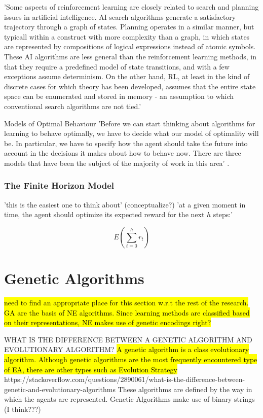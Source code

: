 'Some aspects of reinforcement learning are closely related to search and planning issues in artificial intelligence. AI search algorithms generate a satisfactory trajectory through a graph of states. Planning operates in a similar manner, but typicall within a construct with more complexity than a graph, in which states are represented by compositions of logical expressions instead of atomic symbols. These AI algorithms are less general than the reinforcement learning methods, in that they require a predefined model of state transitions, and with a few exceptions assume determinism. On the other hand, RL, at least in the kind of discrete cases for which theory has been developed, assumes that the entire state space can be enumerated and stored in memory - an assumption to which conventional search algorithms are not tied.' \cite{KaelblingLittmanMoore1996}

Models of Optimal Behaviour
'Before we can start thinking about algorithms for learning to behave optimally, we have to decide what our model of optimality will be. In particular, we have to specify how the agent should take the future into account in the decisions it makes about how to behave now. There are three models that have been the subject of the majority of work in this area' \cite{KaelblingLittmanMoore1996}.

\subsubsection{The Finite Horizon Model} \cite{KaelblingLittmanMoore1996}
'this is the easiest one to think about' (conceptualize?)
'at a given moment in time, the agent should optimize its expected reward for the next $h$ steps:'

\begin{equation}
E(\sum_{t=0}^{h} r_t)
\end{equation}



\section{Genetic Algorithms}

\hl{need to find an appropriate place for this section w.r.t the rest of the research. GA are the basis of NE algorithms. Since learning methods are classified based on their representations, NE makes use of genetic encodings right?}

WHAT IS THE DIFFERENCE BETWEEN A GENETIC ALGORITHM AND EVOLUTIONARY ALGORITHM?
\hl{A genetic algorithm is a class evolutionary algorithm. Although genetic algorithms are the most frequently encountered type of EA, there are other types such as Evolution Strategy}
https://stackoverflow.com/questions/2890061/what-is-the-difference-between-genetic-and-evolutionary-algorithms
These algorithms are defined by the way in which the agents are represented. Genetic Algorithms make use of binary strings (I think???)



